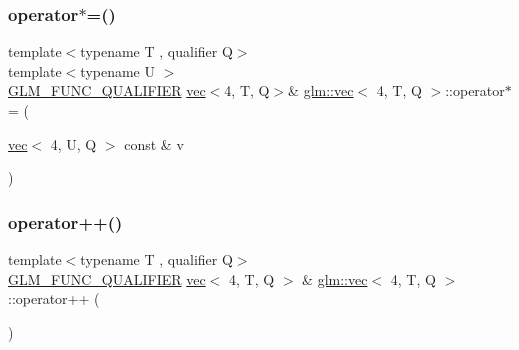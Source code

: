 \mbox{\label{structglm_1_1vec_3_014_00_01_t_00_01_q_01_4_a8223cbe0c80067bda5e8a87ebc4098cf}} 
\subsubsection{\texorpdfstring{operator$\ast$=()}{operator*=()}\hspace{0.1cm}{\footnotesize\ttfamily [6/6]}}
{\footnotesize\ttfamily template$<$typename T , qualifier Q$>$ \\
template$<$typename U $>$ \\
\hyperlink{setup_8hpp_a33fdea6f91c5f834105f7415e2a64407}{G\+L\+M\+\_\+\+F\+U\+N\+C\+\_\+\+Q\+U\+A\+L\+I\+F\+I\+ER} \hyperlink{structglm_1_1vec}{vec}$<$4, T, Q$>$\& \hyperlink{structglm_1_1vec}{glm\+::vec}$<$ 4, T, Q $>$\+::operator$\ast$= (\begin{DoxyParamCaption}\item[{\hyperlink{structglm_1_1vec}{vec}$<$ 4, U, Q $>$ const \&}]{v }\end{DoxyParamCaption})}

\mbox{\label{structglm_1_1vec_3_014_00_01_t_00_01_q_01_4_a8729def59c3f8b14075332c8603dd5c7}} 
\subsubsection{\texorpdfstring{operator++()}{operator++()}\hspace{0.1cm}{\footnotesize\ttfamily [1/2]}}
{\footnotesize\ttfamily template$<$typename T , qualifier Q$>$ \\
\hyperlink{setup_8hpp_a33fdea6f91c5f834105f7415e2a64407}{G\+L\+M\+\_\+\+F\+U\+N\+C\+\_\+\+Q\+U\+A\+L\+I\+F\+I\+ER} \hyperlink{structglm_1_1vec}{vec}$<$ 4, T, Q $>$ \& \hyperlink{structglm_1_1vec}{glm\+::vec}$<$ 4, T, Q $>$\+::operator++ (\begin{DoxyParamCaption}{ }\end{DoxyParamCaption})}

\mbox{\label{structglm_1_1vec_3_014_00_01_t_00_01_q_01_4_a622a107338ed3355458bf43b9e078b7b}} 
